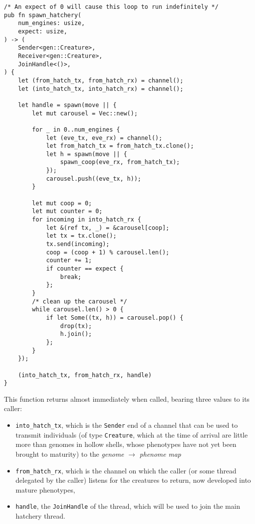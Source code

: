 \documentclass[11pt]{article}
\begin{document}
\lstset{language=rust,label=org1d4aba8,caption= ,captionpos=b,numbers=none}
\begin{lstlisting}
/* An expect of 0 will cause this loop to run indefinitely */
pub fn spawn_hatchery(
    num_engines: usize,
    expect: usize,
) -> (
    Sender<gen::Creature>,
    Receiver<gen::Creature>,
    JoinHandle<()>,
) {
    let (from_hatch_tx, from_hatch_rx) = channel();
    let (into_hatch_tx, into_hatch_rx) = channel();

    let handle = spawn(move || {
        let mut carousel = Vec::new();

        for _ in 0..num_engines {
            let (eve_tx, eve_rx) = channel();
            let from_hatch_tx = from_hatch_tx.clone();
            let h = spawn(move || {
                spawn_coop(eve_rx, from_hatch_tx);
            });
            carousel.push((eve_tx, h));
        }

        let mut coop = 0;
        let mut counter = 0;
        for incoming in into_hatch_rx {
            let &(ref tx, _) = &carousel[coop];
            let tx = tx.clone();
            tx.send(incoming);
            coop = (coop + 1) % carousel.len();
            counter += 1;
            if counter == expect {
                break;
            };
        }
        /* clean up the carousel */
        while carousel.len() > 0 {
            if let Some((tx, h)) = carousel.pop() {
                drop(tx); 
                h.join();
            };
        }
    });

    (into_hatch_tx, from_hatch_rx, handle)
}
\end{lstlisting}

This function returns almost immediately when called, 
bearing three values to its caller: 

\begin{itemize}
\item \texttt{into\_hatch\_tx}, which is the \texttt{Sender} end of a channel that can be used 
to transmit individuals (of type \texttt{Creature}, which at the time of arrival 
are little more than genomes in hollow shells, whose phenotypes have not 
yet been brought to maturity) to the \emph{genome \(\rightarrow\) phenome map}
\item \texttt{from\_hatch\_rx}, which is the channel on which the caller (or some thread
delegated by the caller) listens for the creatures to return, now developed
into mature phenotypes,
\item \texttt{handle}, the \texttt{JoinHandle} of the thread, which will be used to join the
main hatchery thread.
\end{itemize}
\end{document}
